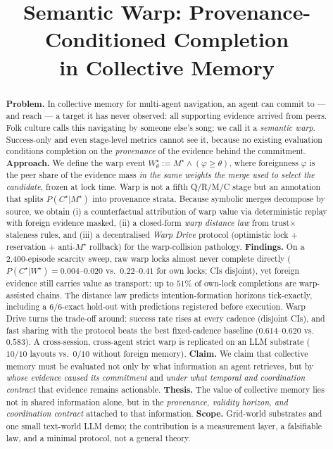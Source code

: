 \documentclass{article}
\title{Semantic Warp: Provenance-Conditioned Completion\\in Collective Memory}
\newcommand{\wstar}{W^{\star}}
\newcommand{\mstar}{M^{\star}}
\newcommand{\cstar}{C^{\star}}
\begin{document}
\maketitle

\begin{abstract}
\textbf{Problem.} In collective memory for multi-agent navigation, an agent can commit to --- and reach --- a target it has never observed: all supporting evidence arrived from peers. Folk culture calls this navigating by someone else's song; we call it a \emph{semantic warp}. Success-only and even stage-level metrics cannot see it, because no existing evaluation conditions completion on the \emph{provenance} of the evidence behind the commitment.
\textbf{Approach.} We define the warp event $\wstar_\theta := \mstar \wedge (\varphi \ge \theta)$, where foreignness $\varphi$ is the peer share of the evidence mass \emph{in the same weights the merge used to select the candidate}, frozen at lock time. Warp is not a fifth Q/R/M/C stage but an annotation that splits $P(\cstar|\mstar)$ into provenance strata. Because symbolic merges decompose by source, we obtain (i) a counterfactual attribution of warp value via deterministic replay with foreign evidence masked, (ii) a closed-form \emph{warp distance law} from trust$\times$staleness rules, and (iii) a decentralised \emph{Warp Drive} protocol (optimistic lock + reservation + anti-$\mstar$ rollback) for the warp-collision pathology.
\textbf{Findings.} On a 2{,}400-episode scarcity sweep, raw warp locks almost never complete directly ($P(\cstar|\wstar)=0.004$--$0.020$ vs.\ $0.22$--$0.41$ for own locks; CIs disjoint), yet foreign evidence still carries value as transport: up to $51\%$ of own-lock completions are warp-assisted chains. The distance law predicts intention-formation horizons tick-exactly, including a $6/6$-exact hold-out with predictions registered before execution. Warp Drive turns the trade-off around: success rate rises at every cadence (disjoint CIs), and fast sharing with the protocol beats the best fixed-cadence baseline ($0.614$--$0.620$ vs.\ $0.583$). A cross-session, cross-agent strict warp is replicated on an LLM substrate ($10/10$ layouts vs.\ $0/10$ without foreign memory).
\textbf{Claim.} We claim that collective memory must be evaluated not only by what information an agent retrieves, but by \emph{whose evidence caused its commitment} and \emph{under what temporal and coordination contract} that evidence remains actionable.
\textbf{Thesis.} The value of collective memory lies not in shared information alone, but in the \emph{provenance, validity horizon, and coordination contract} attached to that information.
\textbf{Scope.} Grid-world substrates and one small text-world LLM demo; the contribution is a measurement layer, a falsifiable law, and a minimal protocol, not a general theory.
\end{abstract}
\end{document}
